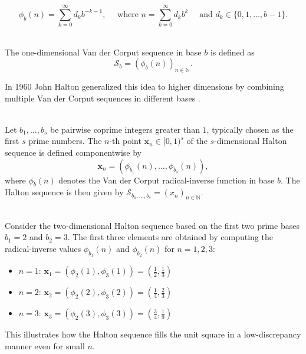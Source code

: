 \begin{equation*}
    \phi_b(n) = \sum_{k=0}^\infty d_k b^{-k-1}, \quad \text{ where } n = \sum_
    {k=0}^\infty d_k b^k \quad \text{ and } d_k \in \{0, 1, \dots, b-1\}.
\end{equation*}

\begin{definition} \ \\
\label{def:van-der-corput-sequence}
The one-dimensional Van der Corput sequence in base $b$ is defined as
\begin{equation*}
    \mathcal{S}_b = \left( \phi_b(n) \right)_{n\in \mathbb{N}}.
\end{equation*}
\end{definition}

In 1960 John Halton generalized this idea to higher dimensions by combining multiple Van
der Corput sequences in different bases \cite{halton1960efficiency}.

\begin{definition} \ \\
\label{def:halton}
Let $b_1, \dots, b_s$ be pairwise coprime integers greater than $1$, typically
chosen as the first $s$ prime numbers. The $n$-th point $\boldsymbol{x}_n \in
[0,1)^s$ of the $s$-dimensional Halton sequence is defined componentwise by
\begin{equation*}
    \boldsymbol{x}_n = \left( \phi_{b_1}(n), \dots, \phi_{b_s}(n) \right),
\end{equation*}
where $\phi_b(n)$ denotes the Van der Corput radical-inverse function in base
$b$. The Halton sequence is then given by $\mathcal{S}_{b_1, \dots, b_s} =
(x_n)_{n\in \mathbb{N}}$.
\end{definition}

\begin{example} \ \\
Consider the two-dimensional Halton sequence based on the first two prime bases
$b_1 = 2$ and $b_2 = 3$. The first three elements are obtained by computing the
radical-inverse values $\phi_{b_1}(n)$ and $\phi_{b_2}(n)$ for $n = 1, 2, 3$:

\begin{itemize}
    \item $n = 1$: $\boldsymbol{x}_1 = \left( \phi_2(1), \phi_3(1) \right) =
    \left( \tfrac{1}{2}, \tfrac{1}{3} \right)$
    \item $n = 2$: $\boldsymbol{x}_2 = \left( \phi_2(2), \phi_3(2) \right) =
    \left( \tfrac{1}{4}, \tfrac{2}{3} \right)$
    \item $n = 3$: $\boldsymbol{x}_3 = \left( \phi_2(3), \phi_3(3) \right) =
    \left( \tfrac{3}{4}, \tfrac{1}{9} \right)$
\end{itemize}

This illustrates how the Halton sequence fills the unit square in a
low-discrepancy manner even for small $n$.
\end{example}

